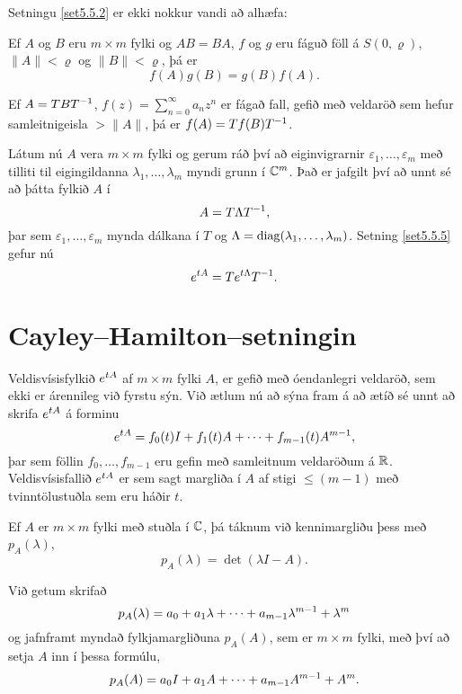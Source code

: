 Setningu \ref{set5.5.2} er ekki nokkur vandi að alhæfa:

\begin{se}
Ef $A$ og $B$ eru $m\times m$ fylki og $AB=BA$, $f$ og $g$ eru fáguð
föll á $S(0,\varrho)$, $\|A\|< \varrho$ og $\|B\|<\varrho$, þá er
 $$f(A)g(B)=g(B)f(A).
 $$
\end{se}



\begin{se}\label{set5.5.5}
Ef $A=TBT\sp{-1}$, $f(z)=\sum_{n=0}^\infty a_nz^n$ er fágað fall,
gefið  með veldaröð sem hefur samleitnigeisla $>\|A\|$, þá er
$f(A)=Tf(B)T\sp{-1}$. 
\end{se}

\medskip
Látum nú $A$ vera $m\times m$ fylki og gerum ráð því að
eiginvigrarnir $\varepsilon_1,\dots,\varepsilon_m$ með tilliti til
eigingildanna $\lambda_1,\dots,\lambda_m$ myndi grunn í ${\mathbb C}\sp m$.
Það er jafgilt því að unnt sé að þátta fylkið $A$ í
 $$A=T\Lambda T\sp{-1},
 $$
þar sem $\varepsilon_1,\dots,\varepsilon_m$ mynda dálkana í
$T$ og $\Lambda={\operatorname{diag}}(\lambda_1,\dots,\lambda_m)$.
Setning \ref{set5.5.5} gefur nú
 $$e\sp{t A}=Te\sp{t\Lambda} T\sp{-1}.
 $$



\section{Cayley--Hamilton--setningin
}

\noindent
Veldisvísisfylkið $e\sp {tA}$ af $m\times m$ fylki $A$,
 er gefið með óendanlegri veldaröð, sem
ekki er árennileg við fyrstu sýn.  Við ætlum nú að sýna fram á að
ætíð sé unnt að skrifa $e\sp{tA}$ á forminu
 $$e\sp{tA}= f_0(t)I+f_1(t)A+\cdots+f_{m-1}(t)A\sp{m-1}, 
 $$
þar sem föllin $f_0,\dots,f_{m-1}$ eru gefin með samleitnum
veldaröðum á ${\mathbb R}$.
Veldisvísisfallið $e\sp{tA}$ er sem sagt margliða í $A$ af stigi 
$\leq (m-1)$  með tvinntölustuðla sem eru háðir $t$.  

\begin{sk} Ef $A$ er $m\times m$ fylki með stuðla í ${\mathbb C}$, þá táknum við
kennimargliðu þess með $p_A(\lambda)$, 
 $$p_A(\lambda)=\det(\lambda I-A).
 $$
\end{sk}

 
Við getum skrifað
 $$
p_A(\lambda)=a_0+a_1\lambda+\cdots+a_{m-1}\lambda\sp{m-1}+\lambda\sp m
 $$
og jafnframt myndað fylkjamargliðuna $p_A(A)$, sem er $m\times m$ fylki,
með
því að setja $A$ inn í þessa formúlu,
 $$
p_A(A)=a_0I+a_1A+\cdots+a_{m-1}A\sp{m-1}+A\sp m.
 $$

